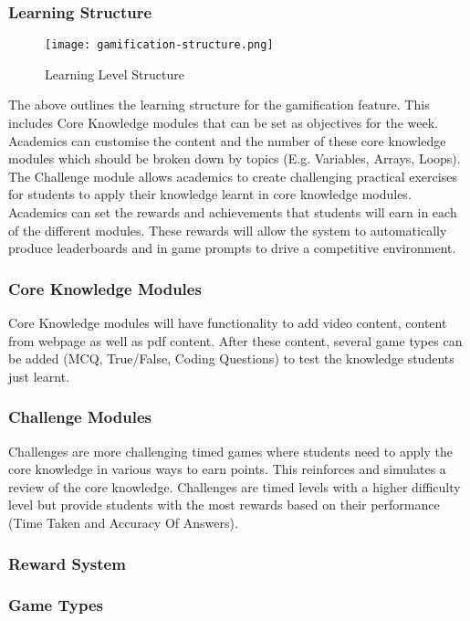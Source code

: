 \subsubsection{Learning Structure}
\begin{figure}[h!]
    \texttt{[image: gamification-structure.png]}
    \centering
    \caption{Learning Level Structure}
\end{figure}

The above outlines the learning structure for the gamification feature. This includes Core Knowledge modules that can be set as objectives for the week. Academics can customise the content and the number of these core knowledge modules which should be broken down by topics (E.g. Variables, Arrays, Loops). The Challenge module allows academics to create challenging practical exercises for students to apply their knowledge learnt in core knowledge modules. Academics can set the rewards and achievements that students will earn in each of the different modules. These rewards will allow the system to automatically produce leaderboards and in game prompts to drive a competitive environment.

\subsubsection{Core Knowledge Modules}
Core Knowledge modules will have functionality to add video content, content from webpage as well as pdf content. After these content, several game types can be added (MCQ, True/False, Coding Questions) to test the knowledge students just learnt. 

\subsubsection{Challenge Modules}
Challenges are more challenging timed games where students need to apply the core knowledge in various ways to earn points. This reinforces and simulates a review of the core knowledge. Challenges are timed levels with a higher difficulty level but provide students with the most rewards based on their performance (Time Taken and Accuracy Of Answers).

\subsubsection{Reward System}


\subsubsection{Game Types}


